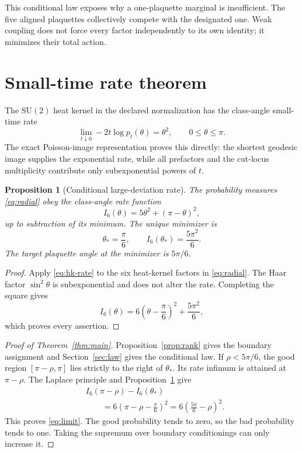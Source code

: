 \documentclass[11pt]{article}
\newtheorem{proposition}[theorem]{Proposition}
\theoremstyle{definition}
\newcommand{\SU}{\mathrm{SU}(2)}
\begin{document}
This conditional law exposes why a one-plaquette marginal is insufficient.
The five aligned plaquettes collectively compete with the designated one.
Weak coupling does not force every factor independently to its own identity;
it minimizes their total action.

\section{Small-time rate theorem}\label{sec:rate}

The $\SU$ heat kernel in the declared normalization has the class-angle
small-time rate
\begin{equation}\label{eq:hk-rate}
 \lim_{t\downarrow0}-2t\log p_t(\theta)=\theta^2,
 \qquad 0\le\theta\le\pi.
\end{equation}
The exact Poisson-image representation proves this directly: the shortest
geodesic image supplies the exponential rate, while all prefactors and the
cut-locus multiplicity contribute only subexponential powers of $t$.

\begin{proposition}[Conditional large-deviation rate]\label{prop:rate}
The probability measures \eqref{eq:radial} obey the class-angle rate function
\begin{equation}\label{eq:I}
 I_6(\theta)=5\theta^2+(\pi-\theta)^2,
\end{equation}
up to subtraction of its minimum.  The unique minimizer is
\[
 \theta_*=\frac\pi6,
 \qquad
 I_6(\theta_*)=\frac{5\pi^2}{6}.
\]
The target plaquette angle at the minimizer is $5\pi/6$.
\end{proposition}

\begin{proof}
Apply \eqref{eq:hk-rate} to the six heat-kernel factors in
\eqref{eq:radial}.  The Haar factor $\sin^2\theta$ is subexponential and does
not alter the rate.  Completing the square gives
\[
 I_6(\theta)
 =6\left(\theta-\frac\pi6\right)^2+\frac{5\pi^2}{6},
\]
which proves every assertion.
\end{proof}

\begin{proof}[Proof of Theorem~\ref{thm:main}]
Proposition~\ref{prop:rank} gives the boundary assignment and
Section~\ref{sec:law} gives the conditional law.  If $\rho<5\pi/6$, the good
region $[\pi-\rho,\pi]$ lies strictly to the right of $\theta_*$.  Its rate
infimum is attained at $\pi-\rho$.  The Laplace principle and
Proposition~\ref{prop:rate} give
\begin{align*}
 &I_6(\pi-\rho)-I_6(\theta_*)\\
 &\qquad=6\left(\pi-\rho-\frac\pi6\right)^2
 =6\left(\frac{5\pi}{6}-\rho\right)^2.
\end{align*}
This proves \eqref{eq:limit}.  The good probability tends to zero, so the bad
probability tends to one.  Taking the supremum over boundary conditionings
can only increase it.
\end{proof}
\end{document}
